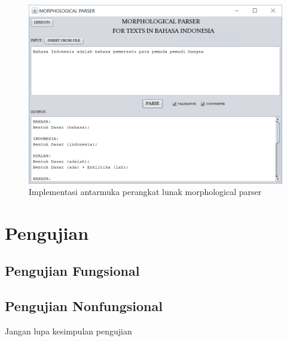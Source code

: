 \begin{figure}[H]
\centering
\includegraphics[scale=0.7]{Gambar/gambar-implementasi-antarmuka}
\caption{Implementasi antarmuka perangkat lunak morphological parser} 
\label{gambar-implementasi-antarmuka}
\end{figure}

\section{Pengujian}
\label{sec:pengujian}

\subsection{Pengujian Fungsional}
\label{sec:pengujianFungsional}

\subsection{Pengujian Nonfungsional}
\label{sec:pengujianNonfungsional}

Jangan lupa kesimpulan pengujian